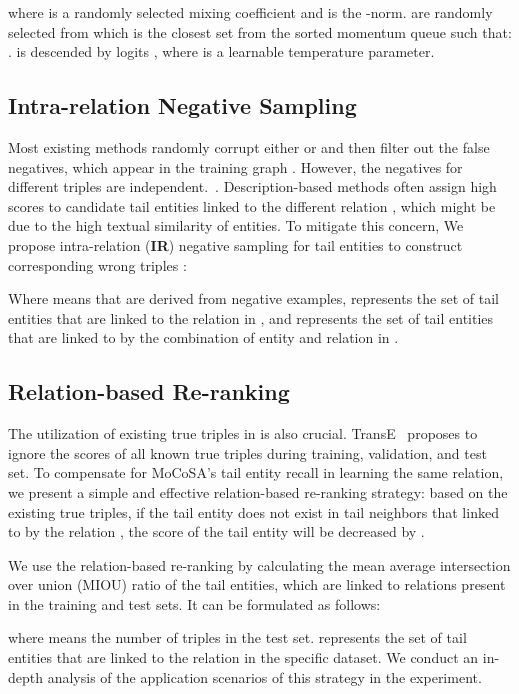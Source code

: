 \documentclass[11pt]{article}
\begin{document}
where  is a randomly selected mixing coefficient and  is the -norm.  are randomly selected from  which is the closest set from the sorted momentum queue  such that: .  is descended by logits , where  is a learnable temperature parameter.

\subsection{Intra-relation Negative Sampling}

Most existing methods randomly corrupt either  or  and then filter out the false negatives, which appear in the training graph . However, the negatives for different triples are independent.~\cite{sun2018rotate, Wang2020StructureAugmentedTR}. Description-based methods often assign high scores to candidate tail entities linked to the different relation , which might be due to the high textual similarity of entities. To mitigate this concern, We propose intra-relation (\textbf{IR}) negative sampling for tail entities to construct corresponding wrong triples :

Where  means that are derived from negative examples,  represents the set of tail entities that are linked to the relation  in , and  represents the set of tail entities that are linked to by the combination of entity  and relation  in .

\subsection{Relation-based Re-ranking}

The utilization of existing true triples in  is also crucial. TransE~\cite{bordes2013translating} proposes to ignore the scores of all known true triples during training, validation, and test set. To compensate for MoCoSA's tail entity recall in learning the same relation, we present a simple and effective relation-based re-ranking strategy: based on the existing true triples, if the tail entity  does not exist in tail neighbors  that linked to by the relation , the score of the tail entity  will be decreased by .


We use the relation-based re-ranking by calculating the mean average intersection over union (MIOU) ratio of the tail entities, which are linked to relations present in the training  and test  sets. It can be formulated as follows:

where  means the number of triples in the test set.  represents the set of tail entities that are linked to the relation  in the specific dataset. We conduct an in-depth analysis of the application scenarios of this strategy in the experiment.
\end{document}
